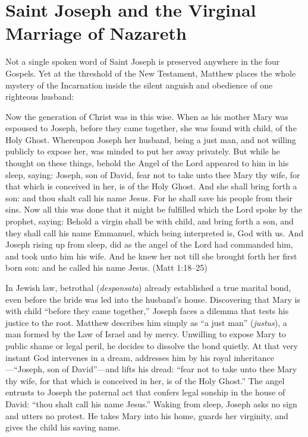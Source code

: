 \section{Saint Joseph and the Virginal Marriage of Nazareth}\label{sec:joseph-virginal-marriage}

Not a single spoken word of Saint Joseph is preserved anywhere in the four Gospels. Yet at the threshold of the New Testament, Matthew places the whole mystery of the Incarnation inside the silent anguish and obedience of one righteous husband:

\begin{scriptureblock}
Now the generation of Christ was in this wise. When as his mother Mary was espoused to Joseph, before they came together, she was found with child, of the Holy Ghost. Whereupon Joseph her husband, being a just man, and not willing publicly to expose her, was minded to put her away privately. But while he thought on these things, behold the Angel of the Lord appeared to him in his sleep, saying: Joseph, son of David, fear not to take unto thee Mary thy wife, for that which is conceived in her, is of the Holy Ghost. And she shall bring forth a son: and thou shalt call his name Jesus. For he shall save his people from their sins. Now all this was done that it might be fulfilled which the Lord spoke by the prophet, saying: Behold a virgin shall be with child, and bring forth a son, and they shall call his name Emmanuel, which being interpreted is, God with us. And Joseph rising up from sleep, did as the angel of the Lord had commanded him, and took unto him his wife. And he knew her not till she brought forth her first born son: and he called his name Jesus. (Matt 1:18--25)
\end{scriptureblock}

In Jewish law, betrothal (\textit{desponsata}) already established a true marital bond, even before the bride was led into the husband's house. Discovering that Mary is with child ``before they came together,'' Joseph faces a dilemma that tests his justice to the root. Matthew describes him simply as ``a just man'' (\textit{justus}), a man formed by the Law of Israel and by mercy. Unwilling to expose Mary to public shame or legal peril, he decides to dissolve the bond quietly. At that very instant God intervenes in a dream, addresses him by his royal inheritance---``Joseph, son of David''---and lifts his dread: ``fear not to take unto thee Mary thy wife, for that which is conceived in her, is of the Holy Ghost.'' The angel entrusts to Joseph the paternal act that confers legal sonship in the house of David: ``thou shalt call his name Jesus.'' Waking from sleep, Joseph asks no sign and utters no protest. He takes Mary into his home, guards her virginity, and gives the child his saving name.


